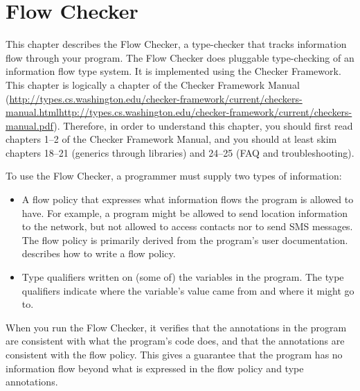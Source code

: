\htmlhr

\newcommand{\theFlowChecker}{the Flow Checker\xspace}
\newcommand{\TheFlowChecker}{The Flow Checker\xspace}

\chapter{Flow Checker\label{flow-checker}}
This chapter describes the Flow Checker, a type-checker that 
tracks information flow through your program.
The Flow Checker does pluggable type-checking of an information flow type
system.  It is implemented using the Checker Framework.  This chapter is
logically a chapter of the 
Checker Framework Manual (\ifhevea\url{http://types.cs.washington.edu/checker-framework/current/checkers-manual.html}\else\url{http://types.cs.washington.edu/checker-framework/current/checkers-manual.pdf}\fi).
Therefore, in order to understand this chapter, you should first read
chapters 1--2 of the Checker Framework Manual, and you should at least skim
chapters 18--21 (generics through libraries) and 24--25 (FAQ and
troubleshooting). 



To use the Flow Checker, a programmer must supply two types of
information:

\begin{itemize}
\item
A flow policy that expresses what information flows the program is allowed
to have.   For example, a program might be allowed to send location
information to the network, but not allowed to access contacts nor to send
SMS messages.  The flow policy is primarily derived from the program's user
documentation.   describes how to write a flow
policy.
\item
{}
Type qualifiers written on (some of) the variables in the program.  The
type qualifiers indicate where the variable's value came from and where it
might go to.
\end{itemize}

When you run the Flow Checker, it verifies that the annotations in the
program are consistent with what the program's code does, and that the
annotations are consistent with the flow policy.  This gives a guarantee
that the program has no information flow beyond what is expressed in the
flow policy and type annotations.



